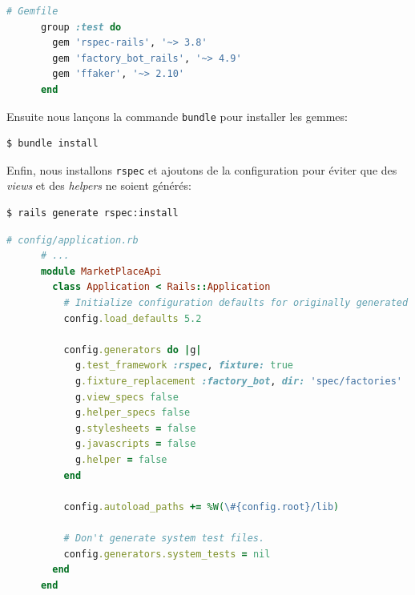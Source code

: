 \documentclass[]{report}
\begin{document}
    \begin{scriptsize}
      \begin{lstlisting}[language=ruby, caption={Gemfile avec la suite de test}, label={lst:add_rspect_to_gemfile}]
      # Gemfile
      group :test do
        gem 'rspec-rails', '~> 3.8'
        gem 'factory_bot_rails', '~> 4.9'
        gem 'ffaker', '~> 2.10'
      end
      \end{lstlisting}
    \end{scriptsize}

    Ensuite nous lançons la commande \verb|bundle| pour installer les gemmes:

    \begin{scriptsize}
      \begin{lstlisting}[language=bash]
      $ bundle install
      \end{lstlisting}
    \end{scriptsize}

    Enfin, nous installons \verb|rspec| et ajoutons de la configuration pour éviter que des \textit{views} et des \textit{helpers} ne soient générés:

    \begin{scriptsize}
      \begin{lstlisting}[language=bash]
      $ rails generate rspec:install
      \end{lstlisting}
    \end{scriptsize}

    \begin{scriptsize}
      \begin{lstlisting}[language=ruby, caption={Configuration de notre suite de test avec respec}, label={lst:setup_rspec}]
      # config/application.rb
      # ...
      module MarketPlaceApi
        class Application < Rails::Application
          # Initialize configuration defaults for originally generated Rails version.
          config.load_defaults 5.2

          config.generators do |g|
            g.test_framework :rspec, fixture: true
            g.fixture_replacement :factory_bot, dir: 'spec/factories'
            g.view_specs false
            g.helper_specs false
            g.stylesheets = false
            g.javascripts = false
            g.helper = false
          end

          config.autoload_paths += %W(\#{config.root}/lib)

          # Don't generate system test files.
          config.generators.system_tests = nil
        end
      end
      \end{lstlisting}
    \end{scriptsize}
\end{document}
